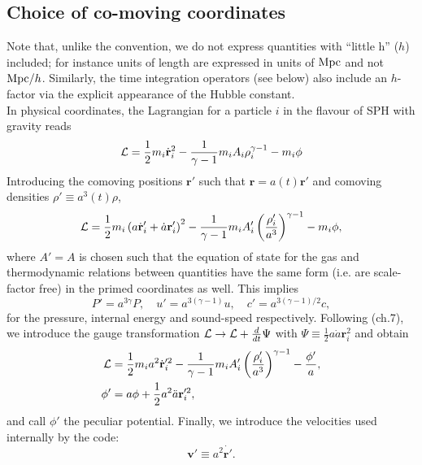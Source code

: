 \subsection{Choice of co-moving coordinates}
\label{ssec:ccordinates}

Note that, unlike the \gadget convention, we do not express quantities with
``little h'' ($h$) included; for instance units of length are expressed in
units of $\rm{Mpc}$ and not ${\rm{Mpc}}/h$. Similarly, the time integration
operators (see below) also include an $h$-factor via the explicit appearance of
the Hubble constant.\\
In physical coordinates, the Lagrangian for a particle $i$ in the
\cite{Springel2002} flavour of SPH with gravity reads
\begin{equation}
  \mathcal{L} =
  \frac{1}{2} m_i \dot{\mathbf{r}}_i^2 -
  \frac{1}{\gamma-1}m_iA_i\rho_i^{\gamma-1} -
  m_i \phi
\end{equation}
Introducing the comoving positions $\mathbf{r}'$ such that $\mathbf{r}
= a(t) \mathbf{r}'$ and comoving densities $\rho' \equiv a^3(t)\rho$,
\begin{equation}
  \mathcal{L} =
  \frac{1}{2} m_i \left(a\dot{\mathbf{r}}_i' + \dot{a}\mathbf{r}_i'
  \right)^2 - 
  \frac{1}{\gamma-1}m_iA_i'\left(\frac{\rho_i'}{a^3}\right)^{\gamma-1}
  - m_i \phi,
\end{equation}
where $A'=A$ is chosen such that the equation of state for
the gas and thermodynamic relations between quantities have the same
form (i.e. are scale-factor free) in the primed coordinates as
well. This implies
\begin{equation}
  P' = a^{3\gamma}P,\quad u'=a^{3(\gamma-1)}u, \quad c'=a^{3(\gamma-1)/2}c,
\end{equation}
for the pressure, internal energy and sound-speed
respectively. Following \cite{Peebles1980} (ch.7), we introduce the
gauge transformation $\mathcal{L} \rightarrow \mathcal{L} + \frac{d}{dt}\Psi$ with
$\Psi \equiv \frac{1}{2}a\dot{a}\mathbf{r}_i^2$ and obtain
\begin{align}
  \mathcal{L} &= \frac{1}{2}m_ia^2 \dot{\mathbf{r}}_i'^2 -
  \frac{1}{\gamma-1}m_iA_i'\left(\frac{\rho_i'}{a^3}\right)^{\gamma-1}
  -\frac{\phi'}{a},\\
  \phi' &= a\phi + \frac{1}{2}a^2\ddot{a}\mathbf{r}_i'^2,\nonumber
\end{align}
and call $\phi'$ the peculiar potential.  Finally, we introduce the
velocities used internally by the code:
\begin{equation}
  \mathbf{v}' \equiv a^2\dot{\mathbf{r}'}.
\end{equation}
